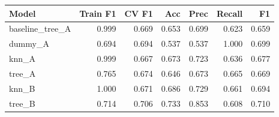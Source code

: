 \begin{tabular}{lrrrrrr}
\hline
Model & Train F1 & CV F1 & Acc & Prec & Recall & F1 \\
\hline
baseline\_tree\_A & 0.999 & 0.669 & 0.653 & 0.699 & 0.623 & 0.659 \\
dummy\_A & 0.694 & 0.694 & 0.537 & 0.537 & 1.000 & 0.699 \\
knn\_A & 0.999 & 0.667 & 0.673 & 0.723 & 0.636 & 0.677 \\
tree\_A & 0.765 & 0.674 & 0.646 & 0.673 & 0.665 & 0.669 \\
knn\_B & 1.000 & 0.671 & 0.686 & 0.729 & 0.661 & 0.694 \\
tree\_B & 0.714 & 0.706 & 0.733 & 0.853 & 0.608 & 0.710 \\
\hline
\end{tabular}